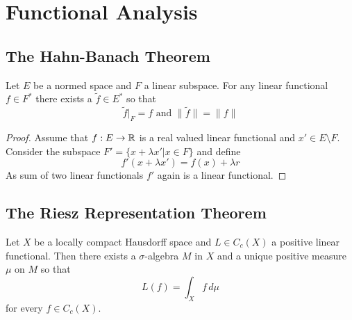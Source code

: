 \newpage
\section{Functional Analysis}

\subsection{The Hahn-Banach Theorem}

\begin{theorem}\label{thm:hahn_banach}
    Let \( E \) be a normed space and \( F \) a linear subspace. For any linear functional 
    \( f \in F^* \) there exists a \( \tilde{f} \in E^* \) so that
    \[
        \tilde{f}|_F = f \text{ and } \|\tilde{f}\| = \|f\|
    \]
\end{theorem}

\begin{proof}
    Assume that \( f: E \to \mathbb{R} \) is a real valued linear functional and \( x' \in E \setminus F \).
    Consider the subspace \( F' = \{x + \lambda x' | x \in F \} \) and define 
    \[
        f'(x + \lambda x') = f(x) + \lambda r 
    \]
    As sum of two linear functionals \( f' \) again is a linear functional.
\end{proof}
\bigskip


\subsection{The Riesz Representation Theorem}

\begin{theorem}\label{thm:riesz_representation}
Let \( X \) be a locally compact Hausdorff space and \( L \in C_c(X) \) a positive linear functional. Then there
exists a \( \sigma \)-algebra \( M \) in \( X \) and a unique positive measure \( \mu \) on \( M \) so that
\[
    L(f) = \int_X f\,d\mu
\]
for every \( f \in C_c(X) \).
\end{theorem}
\bigskip
